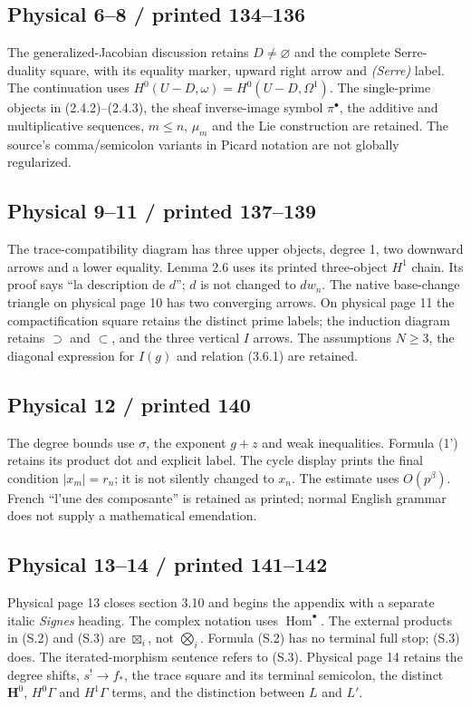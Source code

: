 \documentclass[11pt,leqno]{article}
\DeclareMathOperator{\Hom}{Hom}
\begin{document}
\subsection*{Physical 6--8 / printed 134--136}
The generalized-Jacobian discussion retains $D\ne\varnothing$ and the complete
Serre-duality square, with its equality marker, upward right arrow and
\emph{(Serre)} label. The continuation uses
$H^0(U-D,\omega)=H^0(U-D,\Omega^1)$.
The single-prime objects in (2.4.2)--(2.4.3), the sheaf inverse-image symbol
$\pi^\bullet$, the additive and multiplicative sequences, $m\le n$, $\mu_m$
and the Lie construction are retained. The source's comma/semicolon variants
in Picard notation are not globally regularized.

\subsection*{Physical 9--11 / printed 137--139}
The trace-compatibility diagram has three upper objects, degree 1, two
downward arrows and a lower equality. Lemma 2.6 uses its printed three-object
$H^1$ chain. Its proof says ``la description de $d$''; $d$ is not changed to
$dw_n$. The native base-change triangle on physical page 10 has two converging
arrows. On physical page 11 the compactification square retains the distinct
prime labels; the induction diagram retains $\supset$ and $\subset$, and the
three vertical $I$ arrows. The assumptions $N\ge3$, the diagonal expression
for $I(g)$ and relation (3.6.1) are retained.

\subsection*{Physical 12 / printed 140}
The degree bounds use $\sigma$, the exponent $g+z$ and weak inequalities.
Formula (1') retains its product dot and explicit label. The cycle display
prints the final condition $|x_m|=r_n$; it is not silently changed to $x_n$.
The estimate uses $O(p^\beta)$. French ``l'une des composante'' is retained
as printed; normal English grammar does not supply a mathematical emendation.

\subsection*{Physical 13--14 / printed 141--142}
Physical page 13 closes section 3.10 and begins the appendix with a separate
italic \emph{Signes} heading. The complex notation uses $\Hom^{\bullet}$.
The external products in (S.2) and (S.3) are $\boxtimes_i$, not
$\bigotimes_i$. Formula (S.2) has no terminal full stop; (S.3) does.
The iterated-morphism sentence refers to (S.3). Physical page 14 retains
the degree shifts, $s^!\to f_*$, the trace square and its terminal semicolon,
the distinct $\mathbf H^0$, $H^0\Gamma$ and $H^1\Gamma$ terms, and the distinction between $L$ and $L'$.
\end{document}
